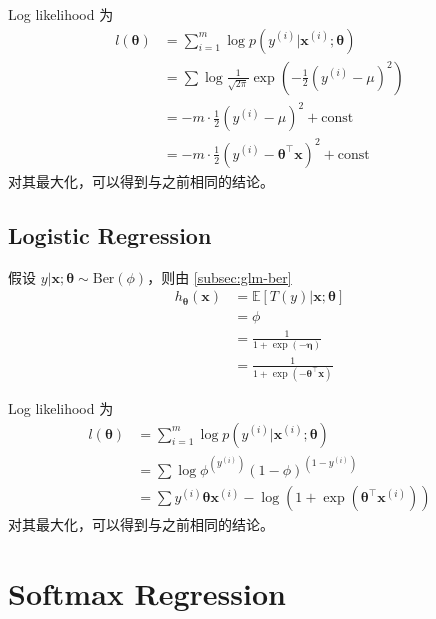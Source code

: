 			Log likelihood 为
			\begin{align*}
				l(\bm{\theta}) &= \sum_{i=1}^{m} \log p(y^{(i)} | \bm{x}^{(i)}; \bm{\theta}) \\
				&= \sum \log \frac{1}{\sqrt{2\pi}} \exp \left( - \frac{1}{2} (y^{(i)}-\mu)^2 \right) \\
				&= -m \cdot \frac{1}{2} (y^{(i)} - \mu)^2 + \text{const} \\
				&= -m \cdot \frac{1}{2} (y^{(i)} - \bm{\theta}^\intercal \bm{x})^2 + \text{const}
			\end{align*}
			对其最大化，可以得到与之前相同的结论。
			
		\subsection{Logistic Regression}
			假设 $ y | \bm{x} ; \bm{\theta} \sim \text{Ber}(\phi) $，则由 \ref{subsec:glm-ber} 
			\begin{align*}
				h_{\bm{\theta}} (\bm{x}) &= \mathbb{E} [T(y) | \bm{x}; \bm{\theta}] \\
				&= \phi \\
				&= \frac{1}{1 + \exp(-\bm{\eta})} \\
				&= \frac{1}{1 + \exp(-\bm{\theta}^\intercal \bm{x})}
			\end{align*}
			
			Log likelihood 为
			\begin{align*}
				l(\bm{\theta}) &= \sum_{i=1}^{m} \log p(y^{(i)} | \bm{x}^{(i)}; \bm{\theta}) \\
				&= \sum \log \phi^{(y^{(i)})} (1-\phi)^{(1-y^{(i)})} \\
				&= \sum y^{(i)} \bm{\theta} \bm{x}^{(i)} - \log \left( 1+\exp(\bm{\theta}^\intercal \bm{x}^{(i)}) \right)
			\end{align*}
			对其最大化，可以得到与之前相同的结论。
			
	\section{Softmax Regression}
